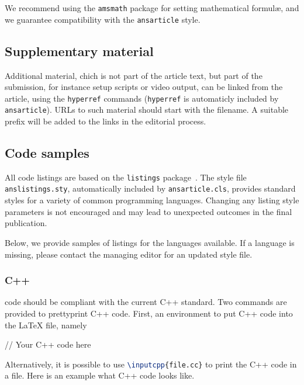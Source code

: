 \documentclass{ansarticle}
\begin{document}
We recommend using the \texttt{amsmath} package for setting
mathematical formul\ae{}, and we guarantee compatibility with the
\texttt{ansarticle} style.


\subsection{Supplementary material}
Additional material, chich is not part of the article text, but part
of the submission, for instance setup scripts or video output, can be
linked from the article, using the \texttt{hyperref} commands
(\texttt{hyperref} is automaticly included by
\texttt{ansarticle}). URLs to such material should start with the
filename. A suitable prefix will be added to the links in the
editorial process.

\subsection{Code samples}

All code listings are based on the \texttt{listings}
package~\cite{HeinzMoses07}.  The style file \texttt{anslistings.sty},
automatically included by \texttt{ansarticle.cls}, provides standard
styles for a variety of common programming languages. Changing any
listing style parameters is not encouraged and may lead to unexpected
outcomes in the final publication.

Below, we provide samples of listings for the languages available. If
a language is missing, please contact the managing editor for an
updated style file.

\subsubsection{C++}
code should be compliant with the current C++ standard. Two
commands are provided to prettyprint C++ code. First, an environment
to put C++ code into the LaTeX file, namely

\begin{latexcode}
\begin{c++}
  // Your C++ code here
\end{c++}
\end{latexcode}

Alternatively, it is possible to use \lstinline[language=TeX]!\inputcpp{file.cc}!
to print the C++ code in a file. Here is an example what C++ code
looks like.
\end{document}
